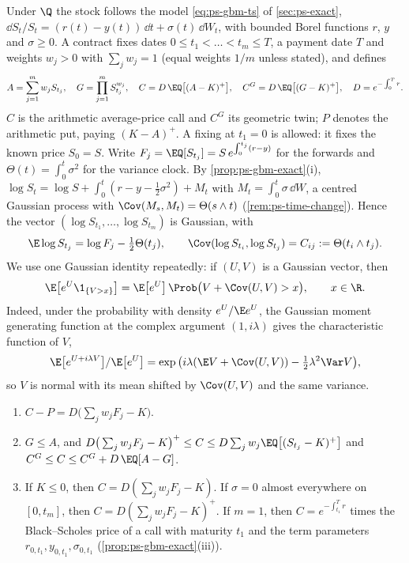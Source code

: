 Under $\Q$ the stock follows the model \eqref{eq:ps-gbm-ts} of \cref{sec:ps-exact},
$\dd S_t/S_t=(r(t)-y(t))\,\dd t+\sigma(t)\,\dd W_t$, with bounded Borel functions $r$, $y$ and
$\sigma\ge0$. A contract fixes dates $0\le t_1<\dots<t_m\le T$, a payment date $T$ and
weights $w_j>0$ with $\sum_jw_j=1$ (equal weights $1/m$ unless stated), and defines
\[
  A=\sum_{j=1}^mw_jS_{t_j},\quad G=\prod_{j=1}^mS_{t_j}^{w_j},\quad
  C=D\,\EQ\big[(A-K)^+\big],\quad C^G=D\,\EQ\big[(G-K)^+\big],\quad D=e^{-\int_0^Tr}.
\]
$C$ is the arithmetic average-price call and $C^G$ its geometric twin; $P$ denotes the
arithmetic put, paying $(K-A)^+$. A fixing at $t_1=0$ is allowed: it fixes the known price
$S_0=S$. Write $F_j=\EQ[S_{t_j}]=S\,e^{\int_0^{t_j}(r-y)}$ for the forwards and
$\Theta(t)=\int_0^t\sigma^2$ for the variance clock. By \cref{prop:ps-gbm-exact}(i),
$\log S_t=\log S+\int_0^t(r-y-\frac12\sigma^2)+M_t$ with $M_t=\int_0^t\sigma\,\dd W$, a
centred Gaussian process with $\Cov(M_s,M_t)=\Theta(s\wedge t)$ (\cref{rem:ps-time-change}).
Hence the vector $(\log S_{t_1},\dots,\log S_{t_m})$ is Gaussian, with
\begin{equation}\label{eq:as-law}
  \E\log S_{t_j}=\log F_j-\tfrac12\Theta(t_j),\qquad
  \Cov(\log S_{t_i},\log S_{t_j})=C_{ij}:=\Theta(t_i\wedge t_j).
\end{equation}
We use one Gaussian identity repeatedly: if $(U,V)$ is a Gaussian vector, then
\begin{equation}\label{eq:as-tilt}
  \E\big[e^U\1_{\{V>x\}}\big]=\E\big[e^U\big]\,\Prob\big(V+\Cov(U,V)>x\big),\qquad x\in\R .
\end{equation}
Indeed, under the probability with density $e^U/\E e^U$, the Gaussian moment generating
function at the complex argument $(1,i\lambda)$ gives the characteristic function of $V$,
\[
  \E\big[e^{U+i\lambda V}\big]/\E\big[e^U\big]=\exp\big(i\lambda(\E V+\Cov(U,V))-\tfrac12\lambda^2\Var V\big),
\]
so $V$ is normal with its mean shifted by $\Cov(U,V)$ and the same variance.

\begin{proposition}\label{prop:as-basic}
\begin{enumerate}[label=(\roman*)]
  \item $C-P=D\big(\sum_jw_jF_j-K\big)$.
  \item $G\le A$, and
    $D\big(\sum_jw_jF_j-K\big)^+\le C\le D\sum_jw_j\EQ\big[(S_{t_j}-K)^+\big]$ and
    $C^G\le C\le C^G+D\,\EQ[A-G]$.
  \item If $K\le0$, then $C=D(\sum_jw_jF_j-K)$. If $\sigma=0$ almost everywhere on
    $[0,t_m]$, then $C=D(\sum_jw_jF_j-K)^+$. If $m=1$, then $C=e^{-\int_{t_1}^Tr}$ times the
    Black--Scholes price of a call with maturity $t_1$ and the term parameters
    $r_{0,t_1},y_{0,t_1},\sigma_{0,t_1}$ (\cref{prop:ps-gbm-exact}(iii)).
\end{enumerate}
\end{proposition}

